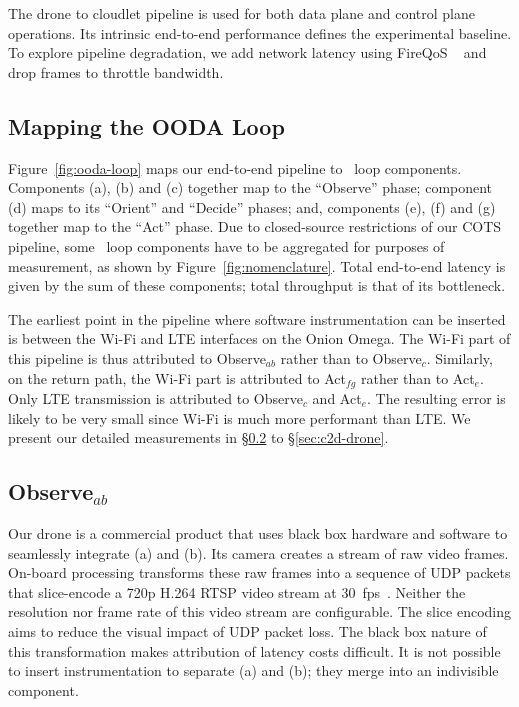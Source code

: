 The drone to cloudlet pipeline is used for both data plane
and control plane operations.  Its intrinsic end-to-end performance
defines the experimental baseline.  To explore pipeline degradation,
we add network latency using FireQoS ~\cite{FireQoS} and drop frames
to throttle bandwidth.

\subsection{Mapping the OODA Loop}
\label{sec:mapping}

Figure~\ref{fig:ooda-loop} maps our end-to-end pipeline to \ooda~loop
components.  Components (a), (b) and (c) together map to the
``Observe'' phase; component (d) maps to its ``Orient'' and
``Decide'' phases; and, components (e), (f) and (g) together map to
the ``Act'' phase.  Due to closed-source restrictions of our COTS
pipeline, some \ooda~loop components have to be aggregated for
purposes of measurement, as shown by Figure~\ref{fig:nomenclature}.
Total end-to-end latency is given by the sum of these components;
total throughput is that of its bottleneck.

The earliest point in the pipeline where software instrumentation can
be inserted is between the Wi-Fi and LTE interfaces on the Onion
Omega.  The Wi-Fi part of this pipeline is thus attributed to
Observe$_{ab}$ rather than to Observe$_{c}$.  Similarly, on the return
path, the Wi-Fi part is attributed to Act$_{fg}$ rather than to
Act$_{e}$. Only LTE transmission is attributed to Observe$_{c}$ and
Act$_{e}$.  The resulting error is likely to be very small since Wi-Fi
is much more performant than LTE.  We present our detailed
measurements in \S\ref{sec:d2c-drone} to \S\ref{sec:c2d-drone}.


\subsection{Observe$_{ab}$}
\label{sec:d2c-drone}

Our drone is a commercial product that uses black box hardware and
software to seamlessly integrate (a) and (b).  Its camera creates a
stream of raw video frames.  On-board processing transforms these raw
frames into a sequence of UDP packets that slice-encode a 720p H.264
RTSP video stream at 30~fps~\cite{Schulzrinne2016}.  Neither the
resolution nor frame rate of this video stream are configurable.  The
slice encoding aims to reduce the visual impact of UDP packet loss.
The black box nature of this transformation makes attribution of
latency costs difficult.  It is not possible to insert instrumentation
to separate (a) and (b); they merge into an indivisible component.


